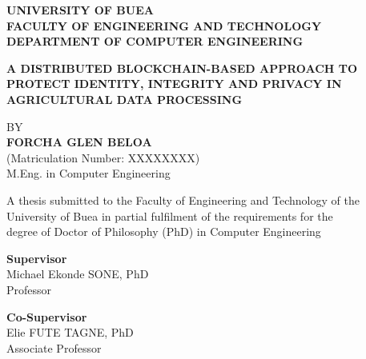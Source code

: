 \documentclass[12pt,a4paper,oneside]{book}
\begin{document}
\clearpage\thispagestyle{empty}\mbox{}   \clearpage
\thispagestyle{empty}
\begin{center}
\begin{singlespace}

{\fontsize{14}{17}\selectfont\bfseries UNIVERSITY OF BUEA}\\[0.4\baselineskip]
{\fontsize{14}{17}\selectfont\bfseries FACULTY OF ENGINEERING AND TECHNOLOGY}\\[0.3\baselineskip]
{\fontsize{14}{17}\selectfont\bfseries DEPARTMENT OF COMPUTER ENGINEERING}

\vspace{2.5\baselineskip}

{\fontsize{16}{19}\selectfont\bfseries
A DISTRIBUTED BLOCKCHAIN-BASED APPROACH TO PROTECT IDENTITY,
INTEGRITY AND PRIVACY IN AGRICULTURAL DATA PROCESSING}

\vspace{2.5\baselineskip}

{\fontsize{14}{17}\selectfont BY}\\[0.4\baselineskip]
{\fontsize{14}{17}\selectfont\bfseries FORCHA GLEN BELOA}\\[0.3\baselineskip]
{\fontsize{12}{14}\selectfont (Matriculation Number: XXXXXXXX)}\\
{\fontsize{12}{14}\selectfont M.Eng. in Computer Engineering}

\vspace{2\baselineskip}

{\fontsize{12}{14}\selectfont
A thesis submitted to the Faculty of Engineering and Technology of the\\
University of Buea in partial fulfilment of the requirements for the\\
degree of Doctor of Philosophy (PhD) in Computer Engineering}

\vspace{2.5\baselineskip}

{\fontsize{14}{17}\selectfont\bfseries Supervisor}\\[0.3\baselineskip]
{\fontsize{12}{14}\selectfont Michael Ekonde SONE, PhD\\ Professor}

\vspace{1.2\baselineskip}

{\fontsize{14}{17}\selectfont\bfseries Co-Supervisor}\\[0.3\baselineskip]
{\fontsize{12}{14}\selectfont Elie FUTE TAGNE, PhD\\ Associate Professor}

\vfill

{\fontsize{14}{17}\selectfont\bfseries \monthyear}

\end{singlespace}
\end{center}
\clearpage
 
\end{document}
